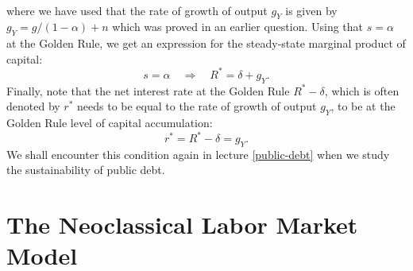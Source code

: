 \documentclass[]{book}
\theoremstyle{definition}
\theoremstyle{definition}
\theoremstyle{definition}
\theoremstyle{remark}
\begin{document}
\begin{enumerate}
\[\begin{aligned}
  \end{aligned}
  \] where we have used that the rate of growth of output \(g_Y\) is
  given by \(g_Y = g/(1-\alpha)+n\) which was proved in an earlier
  question. Using that \(s=\alpha\) at the Golden Rule, we get an
  expression for the steady-state marginal product of capital:
  \[s= \alpha \quad \Rightarrow \quad \boxed{R^{*} = \delta + g_Y}.\]
  Finally, note that the net interest rate at the Golden Rule
  \(R^{*}-\delta\), which is often denoted by \(r^{*}\) needs to be
  equal to the rate of growth of output \(g_Y\), to be at the Golden
  Rule level of capital accumulation:
  \[\boxed{r^{*}=R^{*}-\delta=g_Y}.\] We shall encounter this condition
  again in lecture \ref{public-debt} when we study the sustainability of
  public debt.
\end{enumerate}

\section{The Neoclassical Labor Market
Model}\label{the-neoclassical-labor-market-model-1}
\end{document}

